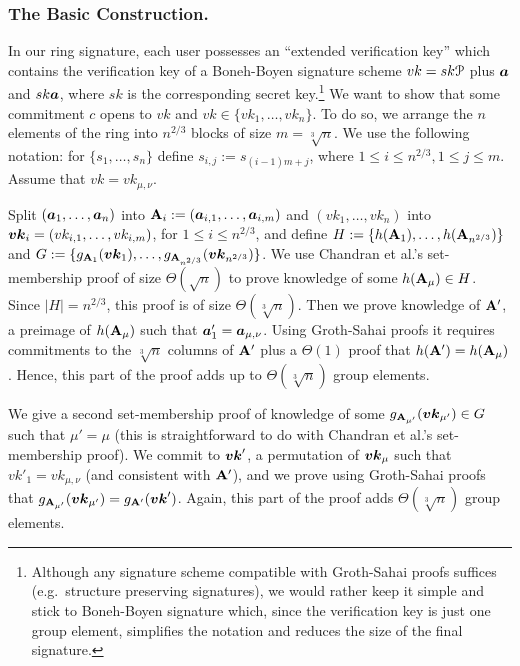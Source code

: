 \subsubsection{The Basic Construction.}
In our ring signature, each user possesses an ``extended verification key'' which contains the verification key of a Boneh-Boyen signature scheme $vk = sk\mathcal{P}$ plus  ${\boldsymbol{a}}$ and $sk{\boldsymbol{a}}$, where $sk$ is the corresponding secret key.\footnote{Although any signature scheme compatible with Groth-Sahai proofs suffices (e.g.~structure preserving signatures), we would rather keep it simple and stick to Boneh-Boyen signature which, since the verification key is just one group element, simplifies the notation and reduces the size of the final signature.} We want to show that some commitment $c$ opens to $vk$ and $vk\in\{vk_1,\ldots,vk_n\}$. To do so, we arrange the $n$ elements of the ring into $n^{2/3}$ blocks of size $m=\sqrt[3]{n}$. We use the following notation: for $\{s_1,\ldots, s_n\}$ define $s_{i,j}:=s_{(i-1)m+j}$, where  $1\leq i \leq n^{2/3},1\leq  j \leq m$. Assume that $vk = vk_{\mu,\nu}$.

Split $({\boldsymbol{a}}_{1},\ldots, {\boldsymbol{a}}_{n})$ into $\mathbf{{A}}_i := ({\boldsymbol{a}}_{i,1},\ldots,{\boldsymbol{a}}_{i,m})$ and $(vk_1,\ldots,vk_n)$ into ${\boldsymbol{vk}}_i = (vk_{i,1},\ldots,vk_{i,m})$,  for $1\leq i\leq n^{2/3}$, and define $H\allowbreak:=\{h(\mathbf{{A}}_1),\allowbreak\ldots,\allowbreak h(\mathbf{{A}}_{n^{2/3}})\}$ and $G := \{g_{\mathbf{{A}}_1}({\boldsymbol{vk}}_1),\ldots,g_{\mathbf{{A}}_{n^{2/3}}}({\boldsymbol{vk}}_{n^{2/3}})\}$.  
We use Chandran et al.'s set-membership proof of size $\Theta(\sqrt{n})$ to prove knowledge of some $h(\mathbf{{A}}_\mu)\in H$. Since $|H|=n^{2/3}$, this proof is of size $\Theta(\sqrt[3]{n})$. Then we prove knowledge of $\mathbf{{A}}'$, a preimage of $h(\mathbf{{A}}_\mu)$ such that ${\boldsymbol{a}}'_1 = {\boldsymbol{a}}_{\mu,\nu}$. Using Groth-Sahai proofs it requires commitments to the $\sqrt[3]{n}$ columns of $\mathbf{{A}}'$ plus a $\Theta(1)$ proof that $h(\mathbf{{A}}')=h(\mathbf{{A}}_\mu)$. Hence, this part of the proof adds up to $\Theta(\sqrt[3]{n})$ group elements.

We give a second set-membership proof of knowledge of some
$g_{\mathbf{{A}}_{\mu'}}({\boldsymbol{vk}}_{\mu'})\in G$ such that $\mu'=\mu$ (this is straightforward to do with Chandran et al.'s set-membership proof).
We commit to ${\boldsymbol{vk}}'$, a permutation of ${\boldsymbol{vk}}_\mu$ such that $vk'_1=vk_{\mu,\nu}$ (and consistent with $\mathbf{{A}}'$), and we prove using Groth-Sahai proofs that $g_{\mathbf{{A}}_{\mu'}}({\boldsymbol{vk}}_{\mu'}) = g_{\mathbf{{A}}'}({\boldsymbol{vk}}')$. Again, this part of the proof adds $\Theta(\sqrt[3]{n})$ group elements.


